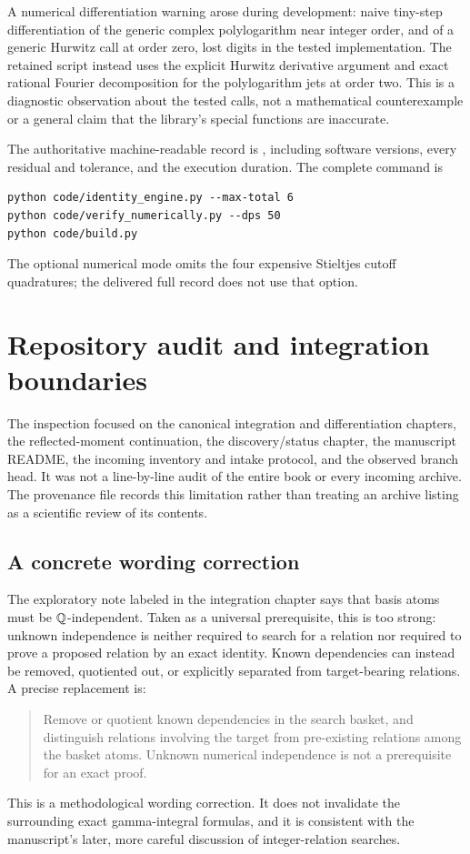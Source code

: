 A numerical differentiation warning arose during development: naive tiny-step differentiation of the generic complex polylogarithm near integer order, and of a generic Hurwitz call at order zero, lost digits in the tested implementation. The retained script instead uses the explicit Hurwitz derivative argument and exact rational Fourier decomposition for the polylogarithm jets at order two. This is a diagnostic observation about the tested calls, not a mathematical counterexample or a general claim that the library's special functions are inaccurate.

The authoritative machine-readable record is , including software versions, every residual and tolerance, and the execution duration. The complete command is
\begin{verbatim}
python code/identity_engine.py --max-total 6
python code/verify_numerically.py --dps 50
python code/build.py
\end{verbatim}
The optional  numerical mode omits the four expensive Stieltjes cutoff quadratures; the delivered full record does not use that option.

\section{Repository audit and integration boundaries}\label{shj:audit}
The inspection focused on the canonical integration and differentiation chapters, the reflected-moment continuation, the discovery/status chapter, the manuscript README, the incoming inventory and intake protocol, and the observed branch head. It was not a line-by-line audit of the entire book or every incoming archive. The provenance file records this limitation rather than treating an archive listing as a scientific review of its contents.

\subsection{A concrete wording correction}
The exploratory note labeled  in the integration chapter says that basis atoms must be $\mathbb Q$-independent. Taken as a universal prerequisite, this is too strong: unknown independence is neither required to search for a relation nor required to prove a proposed relation by an exact identity. Known dependencies can instead be removed, quotiented out, or explicitly separated from target-bearing relations. A precise replacement is:
\begin{quote}
Remove or quotient known dependencies in the search basket, and distinguish relations involving the target from pre-existing relations among the basket atoms. Unknown numerical independence is not a prerequisite for an exact proof.
\end{quote}
This is a methodological wording correction. It does not invalidate the surrounding exact gamma-integral formulas, and it is consistent with the manuscript's later, more careful discussion of integer-relation searches.


